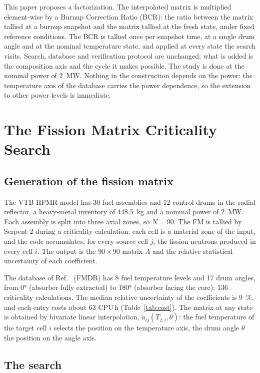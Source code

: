 \documentclass[]{ANStopical}
\begin{document}
This paper proposes a factorization. The interpolated matrix is multiplied element-wise by a Burnup Correction Ratio (BCR): the ratio between the matrix tallied at a burnup snapshot and the matrix tallied at the fresh state, under fixed reference conditions. The BCR is tallied once per snapshot time, at a single drum angle and at the nominal temperature state, and applied at every state the search visits. Search, database and verification protocol are unchanged; what is added is the composition axis and the cycle it makes possible. The study is done at the nominal power of \SI{2}{MW}. Nothing in the construction depends on the power: the temperature axis of the database carries the power dependence, so the extension to other power levels is immediate.

\section{The Fission Matrix Criticality Search}\label{sec:fm}

\subsection{Generation of the fission matrix}

The VTB HPMR model has 30 fuel assemblies and 12 control drums in the radial reflector, a heavy-metal inventory of \SI{448.5}{kg} and a nominal power of \SI{2}{MW}. Each assembly is split into three axial zones, so $N = 90$. The FM is tallied by Serpent 2 during a criticality calculation: each cell is a material zone of the input, and the code accumulates, for every source cell $j$, the fission neutrons produced in every cell $i$. The output is the $90\times 90$ matrix $A$ and the relative statistical uncertainty of each coefficient.

The database of Ref.~\cite{vita2026fm} (FMDB) has 8 fuel temperature levels and 17 drum angles, from \ang{0} (absorber fully extracted) to \ang{180} (absorber facing the core): 136 criticality calculations. The median relative uncertainty of the coefficients is \SI{9}{\percent}, and each entry costs about 63 CPU\,h (Table~\ref{tab:cost}). The matrix at any state is obtained by bivariate linear interpolation, $\tilde a_{ij}(T_{f,i},\theta)$: the fuel temperature of the target cell $i$ selects the position on the temperature axis, the drum angle $\theta$ the position on the angle axis.

\subsection{The search}
\end{document}
